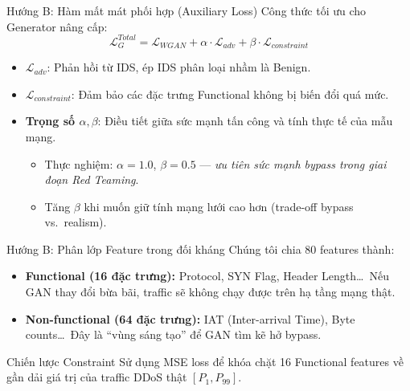 \documentclass[aspectratio=169,11pt]{beamer}
\begin{document}
\begin{frame}{Hướng B: Hàm mất mát phối hợp (Auxiliary Loss)}
  Công thức tối ưu cho Generator nâng cấp:
  \[ \mathcal{L}_G^{Total} = \mathcal{L}_{WGAN}
     + \alpha \cdot \mathcal{L}_{adv}
     + \beta  \cdot \mathcal{L}_{constraint} \]
  \vspace{6pt}
  \begin{itemize}
    \item $\mathcal{L}_{adv}$: Phản hồi từ IDS, ép IDS phân loại nhầm là
          Benign.
    \item $\mathcal{L}_{constraint}$: Đảm bảo các đặc trưng Functional
          không bị biến đổi quá mức.
    \item \textbf{Trọng số $\alpha, \beta$}: Điều tiết giữa sức mạnh tấn
          công và tính thực tế của mẫu mạng.
      \begin{itemize}
        \item Thực nghiệm: $\alpha = 1.0$, $\beta = 0.5$ ---
              \textit{ưu tiên sức mạnh bypass trong giai đoạn Red Teaming}.
        \item Tăng $\beta$ khi muốn giữ tính mạng lưới cao hơn
              (trade-off bypass vs.\ realism).
      \end{itemize}
  \end{itemize}
\end{frame}

\begin{frame}{Hướng B: Phân lớp Feature trong đối kháng}
  Chúng tôi chia 80 features thành:
  \begin{itemize}
    \item \textcolor{danger}{\textbf{Functional (16 đặc trưng):}}
      Protocol, SYN Flag, Header Length\ldots\ Nếu GAN thay đổi bừa bãi,
      traffic sẽ không chạy được trên hạ tầng mạng thật.
    \item \textcolor{detcolor}{\textbf{Non-functional (64 đặc trưng):}}
      IAT (Inter-arrival Time), Byte counts\ldots\ Đây là ``vùng sáng tạo''
      để GAN tìm kẽ hở bypass.
  \end{itemize}
  \begin{alertblock}{Chiến lược Constraint}
    Sử dụng MSE loss để khóa chặt 16 Functional features về gần dải giá trị
    của traffic DDoS thật $[P_1, P_{99}]$.
  \end{alertblock}
\end{frame}
\end{document}
